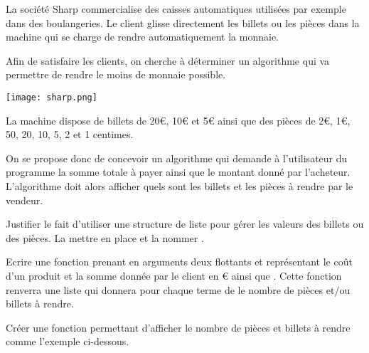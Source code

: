 \begin{minipage}[c]{.6\linewidth}
La société Sharp commercialise des caisses automatiques utilisées par exemple dans des boulangeries. Le client glisse directement les billets ou les pièces dans la machine qui se charge de rendre automatiquement la monnaie. 
\begin{obj}
Afin de satisfaire les clients, on cherche à déterminer un algorithme qui va permettre de rendre le moins de monnaie possible. 
\end{obj}
\end{minipage}\hfill
\begin{minipage}[c]{.37\linewidth}
\begin{center}
\texttt{[image: sharp.png]}
\end{center}
\end{minipage}


La machine dispose de billets de 20€, 10€ et 5€ ainsi que des pièces de 2€, 1€, 50, 20, 10, 5, 2 et 1 centimes. 

On se propose donc de concevoir un algorithme qui demande à l'utilisateur du programme la somme totale à payer ainsi que le montant donné par l'acheteur. L'algorithme doit alors afficher quels sont les billets et les pièces à rendre par le vendeur. 



\question{}
Justifier le fait d'utiliser une structure de liste pour gérer les valeurs des billets ou des pièces. La mettre en place et la nommer .


\question{}
Ecrire une fonction  prenant en arguments deux flottants  et  représentant le coût d'un produit et la somme donnée par le client en € ainsi que . Cette fonction renverra une liste  qui donnera pour chaque terme de  le nombre de pièces et/ou billets à rendre.

\question{} Créer une fonction  permettant d'afficher le nombre de pièces et billets à rendre comme l'exemple ci-dessous.


